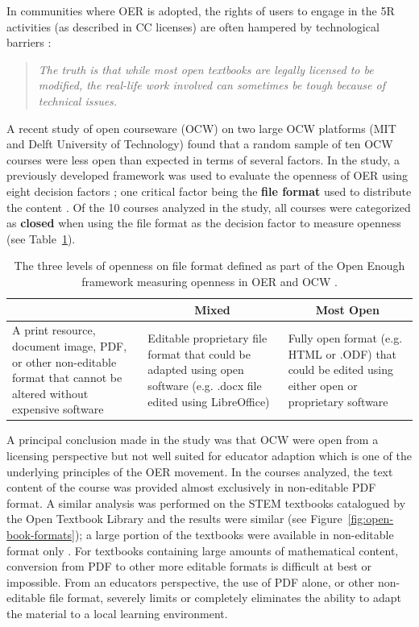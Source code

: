 \documentclass[11pt]{article}
\begin{document}
In communities where OER is adopted, the rights of users to engage in the 5R activities (as described in CC licenses) are often hampered by technological barriers \cite{CC:16, SO:19, MM-EC:19, CE:22}:
\begin{quote}\em
  The truth is that while most open textbooks are legally licensed to be modified, the real-life work involved can sometimes be tough because of technical issues. \cite{CC:16}
\end{quote}
A recent study of open courseware (OCW) on two large OCW platforms (MIT and Delft University of Technology) found that a random sample of ten OCW courses were less open than expected in terms of several factors.  In the study, a previously developed framework was used to evaluate the openness of OER using eight decision factors \cite{MM-EC:19}; one critical factor being the \textbf{file format} used to distribute the content \cite{CE:22}. Of the 10 courses analyzed in the study, all courses were categorized as \textbf{closed} when using the file format as the decision factor to measure openness (see Table~\ref{tab:open-enough}).
\begin{table}
\centering
\renewcommand{\arraystretch}{1.5}
\begin{tabular}{p{5cm}p{5cm}p{5cm}}\hline  
  \rowcolor{Gray}
  \multicolumn{1}{c}{\textbf{Closed}} & \multicolumn{1}{c}{\textbf{Mixed}} & \multicolumn{1}{c}{\textbf{Most Open}}\\ \hline 
A print resource, document image, PDF, or other non-editable format that cannot be altered without expensive software & Editable proprietary file format that could be adapted using open software (e.g. .docx file edited using LibreOffice) & Fully open format (e.g. HTML or .ODF) that could be edited using either open or proprietary software\\[1ex] \hline
\end{tabular}
\caption{The three levels of openness on file format defined as part of the Open Enough framework measuring openness in OER and OCW \cite{MM-EC:19}.}
\label{tab:open-enough}
\end{table}
A principal conclusion made in the study was that OCW were open from a licensing perspective but not well suited for educator adaption which is one of the underlying principles of the OER movement.  In the courses analyzed, the text content of the course was provided almost exclusively in non-editable PDF format.  A similar analysis was performed on the STEM textbooks catalogued by the Open Textbook Library and the results were similar (see Figure~\ref{fig:open-book-formats}); a large portion of the textbooks were available in non-editable format only \cite{CA:22}.  For textbooks containing large amounts of mathematical content, conversion from PDF to other more editable formats is difficult at best or impossible.  From an educators perspective, the use of PDF alone, or other non-editable file format, severely limits or completely eliminates the ability to adapt the material to a local learning environment.
\end{document}
